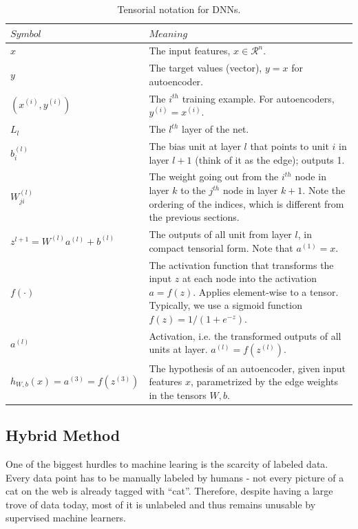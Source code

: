\documentclass[12pt]{article}  %
\begin{document}
\begin{table}[ht]
\begin{center}
\begin{tabular}{ | l | p{10cm} | }

\hline
$Symbol$ & $Meaning$ \\
\hline \hline
$x$ & The input features, $x \in \mathcal{R}^n$. \\
\hline
$y$ & The target values (vector), $y = x$ for autoencoder. \\
\hline
$(x^{(i)}, y^{(i)})$ & The $i^{th}$ training example. For autoencoders, $y^{(i)} = x^{(i)}$. \\
\hline
$L_l$ & The $l^{th}$ layer of the net. \\
\hline
$b^{(l)}_i$ & The bias unit at layer $l$ that points to unit $i$ in layer $l+1$ (think of it as the edge); outputs 1. \\
\hline
$W^{(l)}_{ji}$ & The weight going out from the $i^{th}$ node in layer $k$ to the $j^{th}$ node in layer $k+1$. Note the ordering of the indices, which is different from the previous sections. \\
\hline
$z^{l+1} = W^{(l)} a^{(l)} + b^{(l)}$ & The outputs of all unit from layer $l$, in compact tensorial form. Note that $a^{(1)} = x$. \\
\hline
$f(\cdot)$ & The activation function that transforms the input $z$ at each node into the activation $a = f(z)$. Applies element-wise to a tensor. Typically, we use a sigmoid function $f(z) = 1/(1+e^{-z})$. \\
\hline
$a^{(l)}$ & Activation, i.e. the transformed outputs of all units at layer. $a^{(l)} = f(z^{(l)})$. \\
\hline
$h_{W,b}(x) = a^{(3)} = f(z^{(3)})$ & The hypothesis of an autoencoder, given input features $x$, parametrized by the edge weights in the tensors $W, b$. \\
\hline
\end{tabular}
\caption{Tensorial notation for DNNs.}
\label{tensor-note}
\end{center}
\end{table}




\subsection{Hybrid Method}

One of the biggest hurdles to machine learing is the scarcity of labeled data. Every data point has to be manually labeled by humans - not every picture of a cat on the web is already tagged with ``cat''. Therefore, despite having a large trove of data today, most of it is unlabeled and thus remains unusable by supervised machine learners. 
\end{document}
